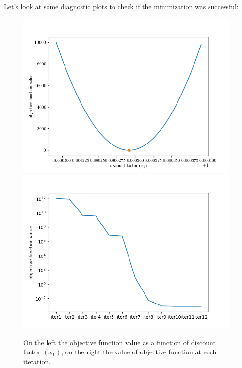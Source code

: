 Let's look at some diagnostic plots to check if the minimization was successful:

\begin{figure}[h]
  \centering
  \includegraphics[width=0.45\linewidth]{obj_func.png}
  \includegraphics[width=0.45\linewidth]{obj_func_iter.png}
  \caption{On the left the objective function value as a function of discount factor $(x_1)$,
  on the right the value of objective function at each iteration.}
\end{figure}

